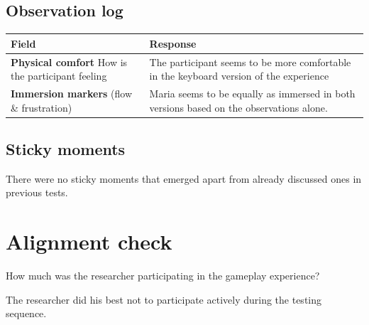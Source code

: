 \subsection{Observation log}
\begin{table}[h]
\centering
\begin{tabular}{|p{5cm}|p{10cm}|}
\hline
\textbf{Field} & \textbf{Response} \\ \hline
\textbf{Physical comfort} How is the participant feeling & The participant seems to be more comfortable in the keyboard version of the experience\\[1.5cm] \hline
\textbf{Immersion markers} (flow \& frustration) & Maria seems to be equally as immersed in both versions based on the observations alone.\\[1.5cm] \hline
\end{tabular}
\end{table}


\subsection{Sticky moments}
There were no sticky moments that emerged apart from already discussed ones in previous tests.


\section{Alignment check}
How much was the researcher participating in the gameplay experience? 

The researcher did his best not to participate actively during the testing sequence. 



